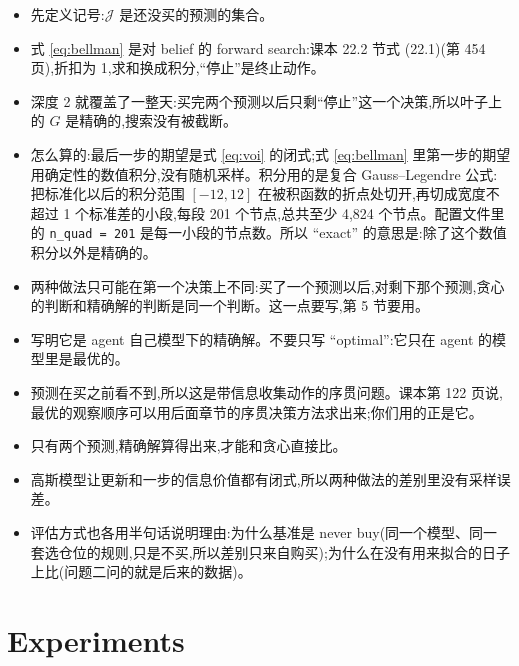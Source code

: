 \documentclass{article}
\newenvironment{pts}{\begin{itemize}[nosep,leftmargin=1.15em,topsep=1pt]}{\end{itemize}}
\newcommand{\rest}{\mathcal{J}}          %
\begin{document}
\begin{note}[约 80 词:精确解]
\begin{pts}
\item 先定义记号:$\rest$ 是还没买的预测的集合。
\item 式 \eqref{eq:bellman} 是对 belief 的 forward search:课本 22.2 节式 (22.1)(第 454 页),折扣为 1,求和换成积分,``停止''是终止动作。
\item 深度 2 就覆盖了一整天:买完两个预测以后只剩``停止''这一个决策,所以叶子上的 $G$ 是精确的,搜索没有被截断。
\item 怎么算的:最后一步的期望是式 \eqref{eq:voi} 的闭式;式 \eqref{eq:bellman} 里第一步的期望用确定性的数值积分,没有随机采样。积分用的是复合 Gauss--Legendre 公式:把标准化以后的积分范围 $[-12, 12]$ 在被积函数的折点处切开,再切成宽度不超过 1 个标准差的小段,每段 201 个节点,总共至少 4{,}824 个节点。配置文件里的 \texttt{n\_quad = 201} 是每一小段的节点数。所以 ``exact'' 的意思是:除了这个数值积分以外是精确的。
\item 两种做法只可能在第一个决策上不同:买了一个预测以后,对剩下那个预测,贪心的判断和精确解的判断是同一个判断。这一点要写,第 5 节要用。
\item 写明它是 agent 自己模型下的精确解。不要只写 ``optimal'':它只在 agent 的模型里是最优的。
\end{pts}
\end{note}

\begin{note}
\begin{pts}
\item 预测在买之前看不到,所以这是带信息收集动作的序贯问题。课本第 122 页说,最优的观察顺序可以用后面章节的序贯决策方法求出来;你们用的正是它。
\item 只有两个预测,精确解算得出来,才能和贪心直接比。
\item 高斯模型让更新和一步的信息价值都有闭式,所以两种做法的差别里没有采样误差。
\item 评估方式也各用半句话说明理由:为什么基准是 never buy(同一个模型、同一套选仓位的规则,只是不买,所以差别只来自购买);为什么在没有用来拟合的日子上比(问题二问的就是后来的数据)。
\end{pts}
\end{note}

\section{Experiments}
\end{document}
